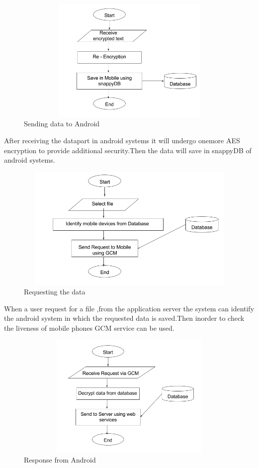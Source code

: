 \documentclass[12pt, a4paper]{article}
\begin{document}
\begin{center}
\begin{figure}[ht!]
    \centering
    \includegraphics[width=15cm,height=6cm,keepaspectratio]{mdsnew1.png}
     \caption{Sending data to Android}
    \label{fig:Sending data to Android}
\end{figure}
\end{center}
After receiving the datapart in android systems it will undergo onemore AES encryption to provide additional security.Then the data will save in snappyDB of android systems.
\begin{center}
\begin{figure}[ht!]
    \centering
  \includegraphics[width=15cm,height=6cm,keepaspectratio]{mdsnew2.png}
  \caption{Requesting the data}
    \label{fig:Requesting the data} 
    
\end{figure}
\end{center}
When a user request for a file ,from the application server the system can identify the android system in which the requested data is saved.Then inorder to check the liveness of mobile phones GCM service can be used.
\begin{center}
\begin{figure}[ht!]
    \centering
  \includegraphics[width=15cm,height=6cm,keepaspectratio]{mdsnew3.png}
     \caption{Response from Android}
    \label{fig:Response from Android}
\end{figure}

\end{center}
\end{document}
